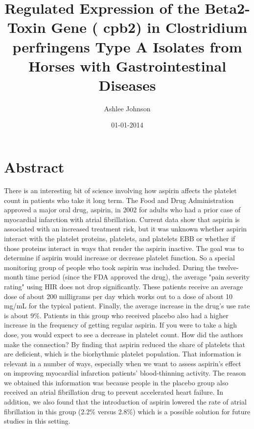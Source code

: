 \documentclass{article}%
\title{Regulated Expression of the Beta2{-}Toxin Gene ( cpb2) in Clostridium perfringens Type A Isolates from Horses with Gastrointestinal Diseases}%
\author{Ashlee Johnson}%
\affil{Oncology Research, Pfizer Worldwide Research and Development, San Diego, California, United States of America}%
\date{01{-}01{-}2014}%
\begin{document}
%
\normalsize%
\maketitle%
\section{Abstract}%
\label{sec:Abstract}%
There is an interesting bit of science involving how aspirin affects the platelet count in patients who take it long term. The Food and Drug Administration approved a major oral drug, aspirin, in 2002 for adults who had a prior case of myocardial infarction with atrial fibrillation. Current data show that aspirin is associated with an increased treatment risk, but it was unknown whether aspirin interact with the platelet proteins, platelets, and platelets EBB or whether if those proteins interact in ways that render the aspirin inactive. The goal was to determine if aspirin would increase or decrease platelet function. So a special monitoring group of people who took aspirin was included. During the twelve{-}month time period (since the FDA approved the drug), the average "pain severity rating" using HIR does not drop significantly. These patients receive an average dose of about 200 milligrams per day which works out to a dose of about 10 mg/mL for the typical patient. Finally, the average increase in the drug's use rate is about 9\%. Patients in this group who received placebo also had a higher increase in the frequency of getting regular aspirin. If you were to take a high dose, you would expect to see a decrease in platelet count. How did the authors make the connection? By finding that aspirin reduced the share of platelets that are deficient, which is the biorhythmic platelet population. That information is relevant in a number of ways, especially when we want to assess aspirin's effect on improving myocardial infarction patients' blood{-}thinning activity. The reason we obtained this information was because people in the placebo group also received an atrial fibrillation drug to prevent accelerated heart failure. In addition, we also found that the introduction of aspirin lowered the rate of atrial fibrillation in this group (2.2\% versus 2.8\%) which is a possible solution for future studies in this setting.\newline%
\end{document}
